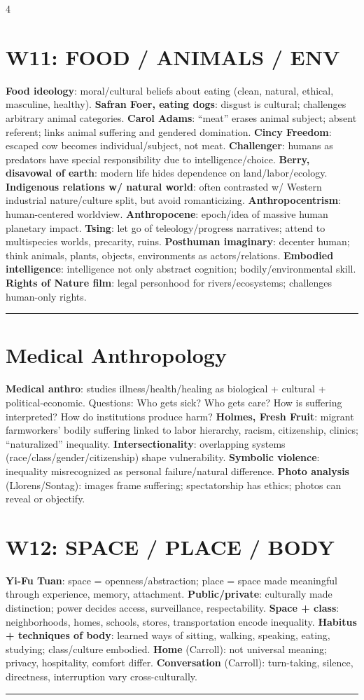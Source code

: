 \documentclass[10pt,landscape]{article}
\newcommand{\kw}[1]{\textbf{#1}}
\newcommand{\sep}{\vspace{0.8pt}\hrule\vspace{0.8pt}}
\begin{document}
\begin{multicols*}{4}
\section*{W11: FOOD / ANIMALS / ENV}
\kw{Food ideology}: moral/cultural beliefs about eating (clean, natural, ethical, masculine, healthy). \kw{Safran Foer, eating dogs}: disgust is cultural; challenges arbitrary animal categories. \kw{Carol Adams}: ``meat'' erases animal subject; absent referent; links animal suffering and gendered domination. \kw{Cincy Freedom}: escaped cow becomes individual/subject, not meat. \kw{Challenger}: humans as predators have special responsibility due to intelligence/choice. \kw{Berry, disavowal of earth}: modern life hides dependence on land/labor/ecology. \kw{Indigenous relations w/ natural world}: often contrasted w/ Western industrial nature/culture split, but avoid romanticizing. \kw{Anthropocentrism}: human-centered worldview. \kw{Anthropocene}: epoch/idea of massive human planetary impact. \kw{Tsing}: let go of teleology/progress narratives; attend to multispecies worlds, precarity, ruins. \kw{Posthuman imaginary}: decenter human; think animals, plants, objects, environments as actors/relations. \kw{Embodied intelligence}: intelligence not only abstract cognition; bodily/environmental skill. \kw{Rights of Nature film}: legal personhood for rivers/ecosystems; challenges human-only rights.
\sep
\section*{Medical Anthropology}
\kw{Medical anthro}: studies illness/health/healing as biological + cultural + political-economic. Questions: Who gets sick? Who gets care? How is suffering interpreted? How do institutions produce harm? \kw{Holmes, Fresh Fruit}: migrant farmworkers' bodily suffering linked to labor hierarchy, racism, citizenship, clinics; ``naturalized'' inequality. \kw{Intersectionality}: overlapping systems (race/class/gender/citizenship) shape vulnerability. \kw{Symbolic violence}: inequality misrecognized as personal failure/natural difference. \kw{Photo analysis} (Llorens/Sontag): images frame suffering; spectatorship has ethics; photos can reveal or objectify.

\section*{W12: SPACE / PLACE / BODY}
\kw{Yi-Fu Tuan}: space = openness/abstraction; place = space made meaningful through experience, memory, attachment. \kw{Public/private}: culturally made distinction; power decides access, surveillance, respectability. \kw{Space + class}: neighborhoods, homes, schools, stores, transportation encode inequality. \kw{Habitus + techniques of body}: learned ways of sitting, walking, speaking, eating, studying; class/culture embodied. \kw{Home} (Carroll): not universal meaning; privacy, hospitality, comfort differ. \kw{Conversation} (Carroll): turn-taking, silence, directness, interruption vary cross-culturally.
\sep

\end{multicols*}
\end{document}
